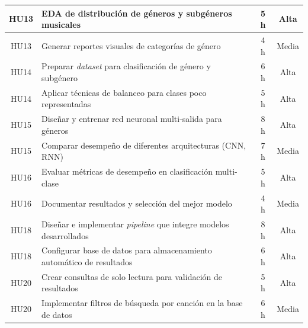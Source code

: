 \documentclass[
11pt, %
]{charter}
\begin{document}
\begin{table}[htpb]
\begin{tabularx}{\linewidth}{@{}|c|X|c|c|@{}}
HU13 & EDA de distribución de géneros y subgéneros musicales & 5 h & Alta \\ \hline
HU13 & Generar reportes visuales de categorías de género & 4 h & Media \\ \hline

HU14 & Preparar \textit{dataset} para clasificación de género y subgénero & 6 h & Alta \\ \hline
HU14 & Aplicar técnicas de balanceo para clases poco representadas & 5 h & Alta \\ \hline

HU15 & Diseñar y entrenar red neuronal multi-salida para géneros & 8 h & Alta \\ \hline
HU15 & Comparar desempeño de diferentes arquitecturas (CNN, RNN) & 7 h & Media \\ \hline

HU16 & Evaluar métricas de desempeño en clasificación multi-clase & 5 h & Alta \\ \hline
HU16 & Documentar resultados y selección del mejor modelo & 4 h & Media \\ \hline

HU18 & Diseñar e implementar \textit{pipeline} que integre modelos desarrollados & 8 h & Alta \\ \hline
HU18 & Configurar base de datos para almacenamiento automático de resultados & 6 h & Alta \\ \hline

HU20 & Crear consultas de solo lectura para validación de resultados & 5 h & Alta \\ \hline
HU20 & Implementar filtros de búsqueda por canción en la base de datos & 6 h & Media \\ \hline
\end{tabularx}
\end{table}


\end{document}
